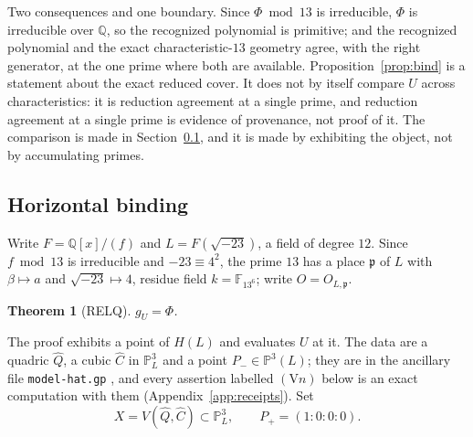 \documentclass[11pt]{amsart}
\newif\ifrelqclosed
\newcommand{\QQ}{\mathbb{Q}}
\newcommand{\FF}{\mathbb{F}}
\newcommand{\PP}{\mathbb{P}}
\newcommand{\sqm}{\sqrt{-23}}
\newcommand{\gU}{g_U}
\newcommand{\pp}{\mathfrak p}
\theoremstyle{plain}
\newtheorem{theorem}{Theorem}[section]
\theoremstyle{definition}
\begin{document}
Two consequences and one boundary. Since $\Phi\bmod13$ is irreducible,
$\Phi$ is irreducible over $\QQ$, so the recognized polynomial is
primitive; and the recognized polynomial and the exact
characteristic-$13$ geometry agree, with the right generator, at the
one prime where both are available. Proposition~\ref{prop:bind} is a
statement about the exact reduced cover. It does not by itself compare
$U$ across characteristics: it is reduction agreement at a single
prime, and reduction agreement at a single prime is evidence of
provenance, not proof of it. The comparison is made in
Section~\ref{sec:horizontal}, and it is made by exhibiting the object,
not by accumulating primes.

\subsection{Horizontal binding}\label{sec:horizontal}

\ifrelqclosed
Write $F=\QQ[x]/(f)$ and $L=F(\sqm)$, a field of degree $12$. Since
$f\bmod13$ is irreducible and $-23\equiv4^2$, the prime $13$ has a
place $\pp$ of $L$ with $\beta\mapsto a$ and $\sqm\mapsto4$, residue
field $k=\FF_{13^6}$; write $O=O_{L,\pp}$.

\begin{theorem}[RELQ]\label{thm:relq}
$\gU=\Phi$.
\end{theorem}

The proof exhibits a point of $H(L)$ and evaluates $U$ at it. The data
are a quadric $\hat Q$, a cubic $\hat C$ in $\PP^3_L$ and a point
$P_-\in\PP^3(L)$; they are in the ancillary file
\texttt{model-hat.gp} \cite{receipts}, and every assertion labelled
$(\mathrm V n)$ below is an exact computation with them
(Appendix~\ref{app:receipts}). Set
\[
  X=V(\hat Q,\hat C)\subset\PP^3_L,\qquad P_+=(1:0:0:0).
\]
\end{document}
